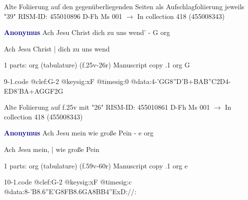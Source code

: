 \documentclass[twocolumn]{book}
\begin{document}
\newline Alte Foliierung auf den gegenüberliegenden Seiten als Aufschlagfoliierung jeweils "39"
\newline RISM-ID: 455010896
\newline D-Fh  Ms 001
\newline $\rightarrow$ In collection 418 (455008343)
      
\newline \par \vspace{7pt} \textcolor{darkblue}{\textbf{Anonymus  }}
\newline Ach Jesu Christ dich zu uns wend' - G
\newline org
\newline \begin{itshape}[f.25v, at left:] Ach Jesu Christ | dich zu uns wend\end{itshape} 
\newline \textcolor{darkblue}{}  1 parts: org (tabulature)  (f.25v-26r)
\newline Manuscript copy
.1  org  G  
\begin{filecontents*}{9-1.code}
@clef:G-2
@keysig:xF
@timesig:0
@data:4-'GG{8''D'B+}{BAB''C}2D4-ED{8'BA+}{AGGF}2G
\end{filecontents*}
\newline
%

\newline Alte Foliierung auf f.25v mit "26"
\newline RISM-ID: 455010861
\newline D-Fh  Ms 001
\newline $\rightarrow$ In collection 418 (455008343)
      
\newline \par \vspace{7pt} \textcolor{darkblue}{\textbf{Anonymus  }}
\newline Ach Jesu mein wie große Pein - e
\newline org
\newline \begin{itshape}[f.59v, at left:] Ach Jesu mein, | wie große Pein\end{itshape} 
\newline \textcolor{darkblue}{}  1 parts: org (tabulature)  (f.59v-60r)
\newline Manuscript copy
.1  org  e  
\begin{filecontents*}{10-1.code}
@clef:G-2
@keysig:xF
@timesig:c
@data:8-{'B8.6''E'G}{8FB8.6GA}{8BB}4''ExD://:
\end{filecontents*}
\newline
%
\end{document}
